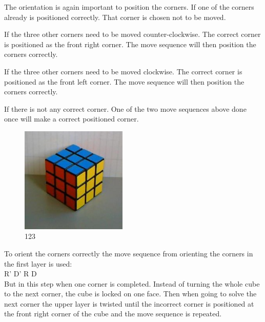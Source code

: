 The orientation is again important to position the corners. If one of the corners already is positioned correctly. That corner is chosen not to be moved. 

If the three other corners need to be moved counter-clockwise. The correct corner is positioned as the front right corner. The move sequence will then position the corners correctly.

If the three other corners need to be moved clockwise. The correct corner is positioned as the front left corner. The move sequence will then position the corners correctly.

If there is not any correct corner. One of the two move sequences above done once will make a correct positioned corner.

\begin{figure}
\begin{center}
	\includegraphics[width=0.45\textwidth]{input/pics/8done.jpg}	
\end{center}
\caption{123}
\label{fig:8done}
\end{figure}

To orient the corners correctly the move sequence from orienting the corners in the first layer is used: \\

R' D' R D \\

But in this step when one corner is completed. Instead of turning the whole cube to the next corner, the cube is locked on one face. Then when going to solve the next corner the upper layer is twisted until the incorrect corner is positioned at the front right corner of the cube and the move sequence is repeated.